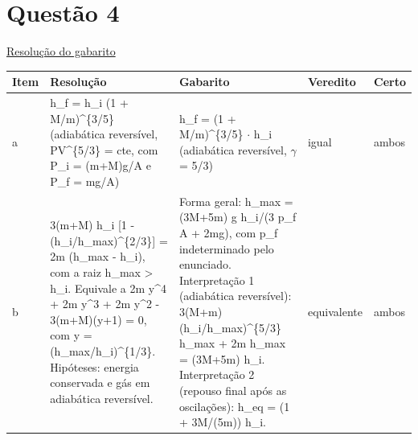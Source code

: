 \documentclass{article}%
\begin{document}
\section*{Questão 4}%
\href{https://poliedroresolve.sistemapoliedro.com.br/vestibulares/ita/2027/ita-2-fase-dia-3-22-10-2026-2-fase-dia-3/dissertativa-4-fisica-2-fase-dia-3-ita-2027}{Resolução do gabarito}\par\smallskip%
\begin{longtable}{@{}p{} p{} p{} p{} p{}@{}}\toprule Item & Resolução & Gabarito & Veredito & Certo \\ \midrule
a & h\_f = h\_i (1 + M/m)\^{}\{3/5\} (adiabática reversível, PV\^{}\{5/3\} = cte, com P\_i = (m+M)g/A e P\_f = mg/A) & h\_f = (1 + M/m)\^{}\{3/5\} $\cdot$ h\_i (adiabática reversível, $\gamma$ = 5/3) & igual & ambos \\
b & 3(m+M) h\_i {[}1 - (h\_i/h\_max)\^{}\{2/3\}{]} = 2m (h\_max - h\_i), com a raiz h\_max > h\_i. Equivale a 2m y\^{}4 + 2m y\^{}3 + 2m y\^{}2 - 3(m+M)(y+1) = 0, com y = (h\_max/h\_i)\^{}\{1/3\}. Hipóteses: energia conservada e gás em adiabática reversível. & Forma geral: h\_max = (3M+5m) g h\_i/(3 p\_f A + 2mg), com p\_f indeterminado pelo enunciado. Interpretação 1 (adiabática reversível): 3(M+m)(h\_i/h\_max)\^{}\{5/3\} h\_max + 2m h\_max = (3M+5m) h\_i. Interpretação 2 (repouso final após as oscilações): h\_eq = (1 + 3M/(5m)) h\_i. & equivalente & ambos \\
\bottomrule\end{longtable}%
\end{document}
